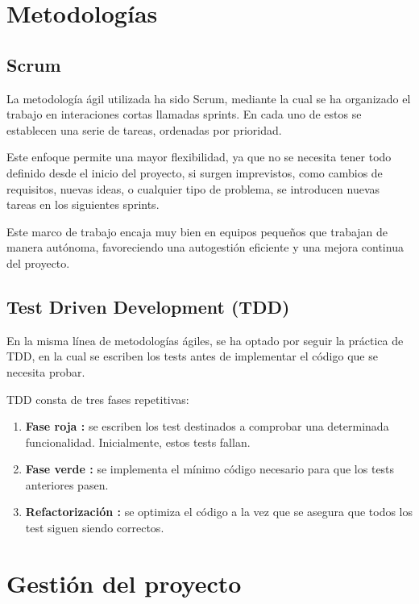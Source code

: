 
\section{Metodologías}\label{sec:metodologias}

\subsection{Scrum}\label{subsec:scrum}

La metodología ágil utilizada ha sido Scrum\cite{scrumorg:whatis}, mediante la cual se ha organizado el trabajo en
interaciones cortas llamadas sprints.
En cada uno de estos se establecen una serie de tareas, ordenadas por prioridad.

Este enfoque permite una mayor flexibilidad, ya que no se necesita tener todo definido desde el inicio del proyecto,
si surgen imprevistos, como cambios de requisitos, nuevas ideas, o cualquier tipo de problema, se introducen nuevas tareas
en los siguientes sprints.

Este marco de trabajo encaja muy bien en equipos pequeños que trabajan de manera autónoma, favoreciendo una autogestión
eficiente y una mejora continua del proyecto.

\subsection{Test Driven Development (TDD)}\label{subsec:tdd}

En la misma línea de metodologías ágiles, se ha optado por seguir la práctica de TDD\cite{browserstack:tdd}, en la cual
se escriben los tests antes de implementar el código que se necesita probar.

TDD consta de tres fases repetitivas:

\begin{enumerate}
    \item \textbf{Fase roja :} se escriben los test destinados a comprobar una determinada funcionalidad.
    Inicialmente, estos tests fallan.
    \item \textbf{Fase verde :} se implementa el mínimo código necesario para que los tests anteriores pasen.
    \item \textbf{Refactorización :} se optimiza el código a la vez que se asegura que todos los test siguen siendo correctos.
\end{enumerate}

\section{Gestión del proyecto}\label{sec:gestion}

